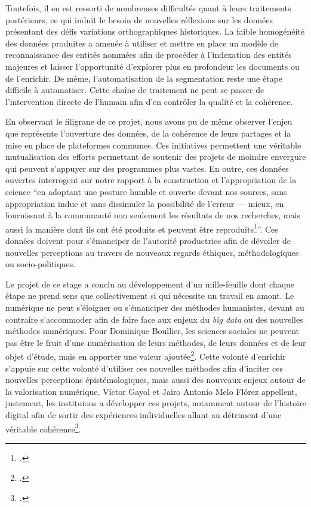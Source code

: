 Toutefois, il en est ressorti de nombreuses difficultés quant à leurs traitements postérieurs, ce qui induit le besoin de nouvelles réflexions sur les données présentant des défis variations orthographiques historiques. La faible homogénéité des données produites a amenée à utiliser et mettre en place un modèle de reconnaissance des entités nommées afin de procéder à l'indexation des entités majeures et laisser l'opportunité d'explorer plus en profondeur les documents ou de l'enrichir. De même, l'automatisation de la segmentation reste une étape difficile à automatiser. Cette chaîne de traitement ne peut se passer de l'intervention directe de l'humain afin d'en contrôler la qualité et la cohérence.

En observant le filigrane de ce projet, nous avons pu de même observer l'enjeu que représente l'ouverture des données, de la cohérence de leurs partages et la mise en place de plateformes communes. Ces initiatives permettent une véritable mutualisation des efforts permettant de soutenir des projets de moindre envergure qui peuvent s'appuyer sur des programmes plus vastes. En outre, ces données ouvertes interrogent sur notre rapport à la construction et l'appropriation de la science \enquote{en adoptant une posture humble et ouverte devant nos sources, sans appropriation indue et sans dissimuler la possibilité de l’erreur — mieux, en fournissant à la communauté non seulement les résultats de nos recherches, mais aussi la manière dont ils ont été produits et peuvent être reproduits\footcite{campsOuVaPhilologie2018}}. Ces données doivent pour s'émanciper de l'autorité productrice afin de dévoiler de nouvelles perceptions au travers de nouveaux regards éthiques, méthodologiques ou socio-politiques.\newpar

Le projet de ce stage a conclu au développement d'un mille-feuille dont chaque étape ne prend sens que collectivement si qui nécessite un travail en amont. Le numérique ne peut s'éloigner ou s'émanciper des méthodes humanistes, devant au contraire s'accommoder afin de faire face aux enjeux du \textit{big data} ou des nouvelles méthodes numériques. Pour Dominique Boullier, les sciences sociales ne peuvent pas être le fruit d'une numérisation de leurs méthodes, de leurs données et de leur objet d’étude, mais en apporter une valeur ajoutée\footcite{boullierSociologieNumerique2016}. Cette volonté d'enrichir s'appuie sur cette volonté d'utiliser ces nouvelles méthodes afin d'inciter ces nouvelles perceptions épistémologiques, mais aussi des nouveaux enjeux autour de la valorisation numérique. Víctor Gayol et Jairo Antonio Melo Flórez appellent, justement, les instituions a développer ces projets, notamment autour de l'histoire digital afin de sortir des expériences individuelles allant au détriment d'une véritable cohérence\footcite{gayolPresentePerspectivasHumanidades2017}.

